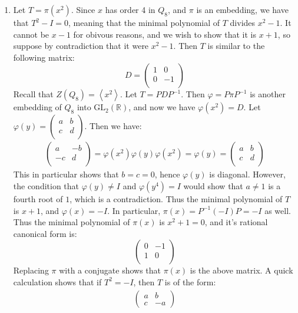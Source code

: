 \documentclass[12pt]{article}
\theoremstyle{definitionstyle}
\def\mbb#1{\mathbb{#1}}
\def\R{\mbb{R}}
\def\cph{\varphi}
\newcommand{\gen}[1]{\left\langle #1 \right\rangle}
\begin{document}
\begin{enumerate}
		\item Let $T = \pi(x^2)$. Since $x$ has order 4 in $Q_8$, and $\pi$ is an embedding, we have that $T^2 - I = 0$, meaning that the minimal polynomial of $T$ divides $x^2-1$. It cannot be $x-1$ for obivous reasons, and we wish to show that it is $x+1$, so suppose by contradiction that it were $x^2-1$. Then $T$ is similar to the following matrix:
		\[D = \begin{pmatrix}
			1 & 0 \\
			0 & -1 \\
			\end{pmatrix}\]
		Recall that $Z(Q_8) = \gen{x^2}$. Let $T = PDP^{-1}$. Then $\cph = P\pi P^{-1}$ is another embedding of $Q_8$ into $\mathrm{GL}_2(\R)$, and now we have $\cph(x^2) = D$. Let $\cph(y) = \begin{pmatrix}
			a & b \\
			c & d \\
		\end{pmatrix}$. Then we have:
		\begin{align*}
			\begin{pmatrix}
				a & -b \\
				-c & d \\
			\end{pmatrix} = \cph(x^2)\cph(y)\cph(x^2) = \cph(y) = \begin{pmatrix}
				a & b \\
				c & d \\
			\end{pmatrix}
		\end{align*}
		This in particular shows that $b = c = 0$, hence $\cph(y)$ is diagonal. However, the condition that $\cph(y) \neq I$ and $\cph(y^4) = I$ would show that $a \neq 1$ is a fourth root of $1$, which is a contradiction. Thus the minimal polynomial of $T$ is $x+1$, and $\cph(x) = -I$. In particular, $\pi(x) = P^{-1}(-I)P = -I$ as well. Thus the minimal polynomial of $\pi(x)$ is $x^2+1=0$, and it's rational canonical form is:
		\[\begin{pmatrix}
			0 & -1 \\
			1 & 0 \\
		\end{pmatrix}\]
		Replacing $\pi$ with a conjugate shows that $\pi(x)$ is the above matrix. A quick calculation shows that if $T^2 = -I$, then $T$ is of the form:
		\begin{align*}
			\begin{pmatrix}
				a & b \\
				c & -a

\end{pmatrix}
\end{align*}
\end{enumerate}
\end{document}
